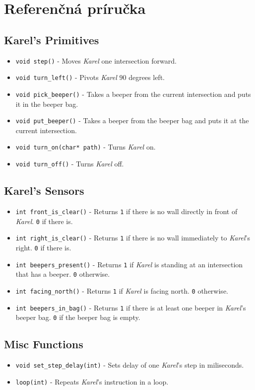 
\chapter{Referenčná príručka}


\section*{Karel's Primitives}

\begin{itemize}
    \item \verb|void step()| - Moves \textit{Karel} one intersection forward.
    \item \verb|void turn_left()| - Pivots \textit{Karel} $90$ degrees left.
    \item \verb|void pick_beeper()| - Takes a beeper from the current intersection and puts it in the beeper bag.
    \item \verb|void put_beeper()| - Takes a beeper from the beeper bag and puts it at the current intersection.
    \item \verb|void turn_on(char* path)| - Turns \textit{Karel} on.
    \item \verb|void turn_off()| - Turns \textit{Karel} off.
\end{itemize}


\section*{Karel's Sensors}

\begin{itemize}
    \item \verb|int front_is_clear()| - Returns \texttt{1} if there is no wall directly in front of \textit{Karel}. \texttt{0} if there is.
    \item \verb|int right_is_clear()| - Returns \texttt{1} if there is no wall immediately to \textit{Karel}'s right. \texttt{0} if there is.
    \item \verb|int beepers_present()| - Returns \texttt{1} if \textit{Karel} is standing at an intersection that has a beeper. \texttt{0} otherwise.
    \item \verb|int facing_north()| - Returns \texttt{1} if \textit{Karel} is facing north. \texttt{0} otherwise.
    \item \verb|int beepers_in_bag()| - Returns \texttt{1} if there is at least one beeper in \textit{Karel}'s beeper bag. \texttt{0} if the beeper bag is empty.
\end{itemize}


\section*{Misc Functions}

\begin{itemize}
    \item \verb|void set_step_delay(int)| - Sets delay of one \textit{Karel}'s step in miliseconds.
    \item \verb|loop(int)| - Repeats \textit{Karel}'s instruction in a loop.
\end{itemize}
